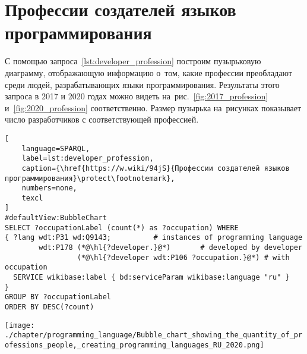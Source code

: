 \section{Профессии создателей языков программирования}

С помощью запроса~\ref{lst:developer_profession} 
построим пузырьковую диаграмму, отображающую информацию о~том, 
какие профессии преобладают среди людей, разрабатывающих языки программирования. 
Результаты этого запроса в 2017 и 2020 годах можно видеть 
на~рис.~\ref{fig:2017_profession} и~\ref{fig:2020_profession} соответственно. 
Размер пузырька на~рисунках показывает число разработчиков с соответствующей профессией.


\newpage
%
%
\begin{lstlisting}[
	language=SPARQL,
	label=lst:developer_profession,
	caption={\href{https://w.wiki/94jS}{Профессии создателей языков программирования}\protect\footnotemark},
    numbers=none,
	texcl
]
#defaultView:BubbleChart
SELECT ?occupationLabel (count(*) as ?occupation) WHERE 
{ ?lang wdt:P31 wd:Q9143;          # instances of programming language 
        wdt:P178 (*@\hl{?developer.}@*)       # developed by developer
                 (*@\hl{?developer wdt:P106 ?occupation.}@*) # with occupation
  SERVICE wikibase:label { bd:serviceParam wikibase:language "ru" }
}
GROUP BY ?occupationLabel 
ORDER BY DESC(?count)
\end{lstlisting}


\begin{marginfigure}[0pt]
    \texttt{[image: ./chapter/programming\_language/Bubble\_chart\_showing\_the\_quantity\_of\_professions\_people,\_creating\_programming\_languages\_RU\_2020.png]}
    \vspace{-5pt}
    \caption[Профессии разработчиков языков программирования, 2020 год.]
    {Профессии разработчиков языков программирования, 2020 год}
    \label{fig:2020_profession}
\end{marginfigure}


